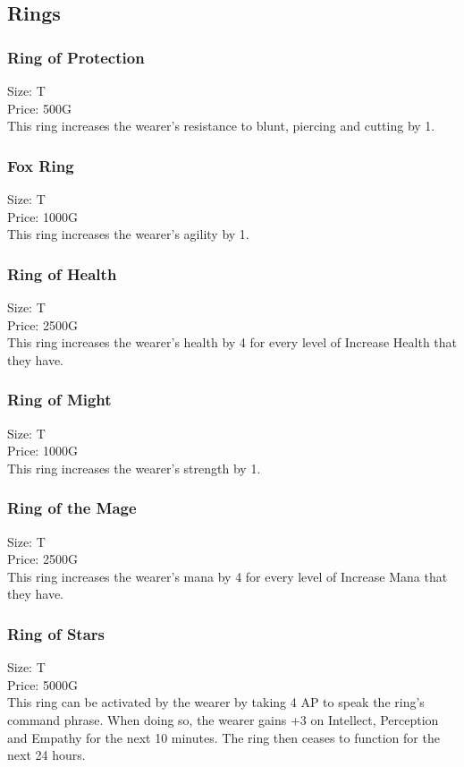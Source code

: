 \subsection{Rings}

\subsubsection{Ring of Protection}
Size: T\\
Price: 500G\\
This ring increases the wearer's resistance to blunt, piercing and cutting by 1.

\subsubsection{Fox Ring}
Size: T\\
Price: 1000G\\
This ring increases the wearer's agility by 1.

\subsubsection{Ring of Health}
Size: T\\
Price: 2500G\\
This ring increases the wearer's health by 4 for every level of Increase Health that they have.

\subsubsection{Ring of Might}
Size: T\\
Price: 1000G\\
This ring increases the wearer's strength by 1.

\subsubsection{Ring of the Mage}
Size: T\\
Price: 2500G\\
This ring increases the wearer's mana by 4 for every level of Increase Mana that they have.

\subsubsection{Ring of Stars}
Size: T\\
Price: 5000G\\
This ring can be activated by the wearer by taking 4 AP to speak the ring's command phrase. When doing so, the wearer gains +3 on Intellect, Perception and Empathy  for the next 10 minutes. The ring then ceases to function for the next 24 hours.